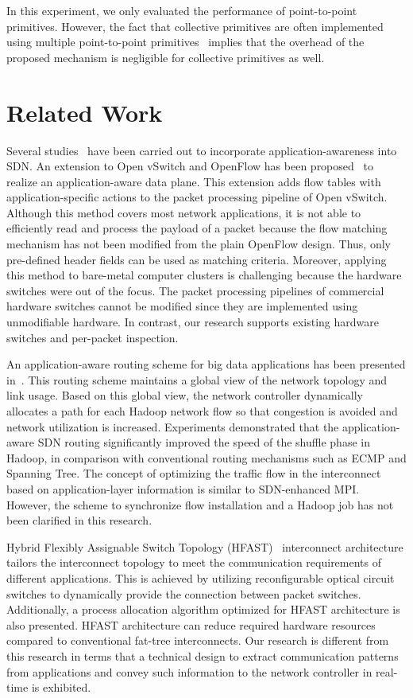 In this experiment, we only evaluated the performance of point-to-point
primitives. However, the fact that collective primitives are often
implemented using multiple point-to-point
primitives~\autocites{Squyres2005}{Huang2006} implies that the overhead
of the proposed mechanism is negligible for collective primitives as
well.

\section{Related Work}\label{iv-related-work}

Several studies~\autocites{Mekky2014}{Cheng2014} have been carried out
to incorporate application-awareness into SDN\@. An extension to Open
vSwitch and OpenFlow has been proposed~\autocite{Mekky2014} to realize
an application-aware data plane. This extension adds flow tables with
application-specific actions to the packet processing pipeline of Open
vSwitch. Although this method covers most network applications, it is
not able to efficiently read and process the payload of a packet because
the flow matching mechanism has not been modified from the plain
OpenFlow design. Thus, only pre-defined header fields can be used as
matching criteria. Moreover, applying this method to bare-metal computer
clusters is challenging because the hardware switches were out of the
focus. The packet processing pipelines of commercial hardware switches
cannot be modified since they are implemented using unmodifiable
hardware. In contrast, our research supports existing hardware switches
and per-packet inspection.

An application-aware routing scheme for big data applications has been
presented in~\autocite{Cheng2014}. This routing scheme maintains a
global view of the network topology and link usage. Based on this global
view, the network controller dynamically allocates a path for each
Hadoop network flow so that congestion is avoided and network
utilization is increased. Experiments demonstrated that the
application-aware SDN routing significantly improved the speed of the
shuffle phase in Hadoop, in comparison with conventional routing
mechanisms such as ECMP and Spanning Tree. The concept of optimizing the
traffic flow in the interconnect based on application-layer information
is similar to SDN-enhanced MPI\@. However, the scheme to synchronize flow
installation and a Hadoop job has not been clarified in this research.

Hybrid Flexibly Assignable Switch Topology (HFAST)~\autocite{Kamil2007}
interconnect architecture tailors the interconnect topology to meet the
communication requirements of different applications. This is achieved
by utilizing reconfigurable optical circuit switches to dynamically
provide the connection between packet switches. Additionally, a process
allocation algorithm optimized for HFAST architecture is also presented.
HFAST architecture can reduce required hardware resources compared to
conventional fat-tree interconnects. Our research is different from this
research in terms that a technical design to extract communication
patterns from applications and convey such information to the network
controller in real-time is exhibited.

